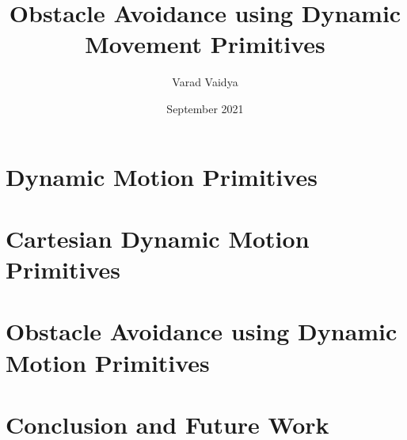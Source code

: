 \documentclass[12pt,A4paper]{report}
\title{Obstacle Avoidance using Dynamic Movement Primitives}
\author{Varad Vaidya}
\date{September 2021}
\begin{document}


\tableofcontents

\chapter{Dynamic Motion Primitives}


\chapter{Cartesian Dynamic Motion Primitives}


\chapter{Obstacle Avoidance using Dynamic Motion Primitives}


\chapter{Conclusion and Future Work}

\printbibliography
\end{document}
